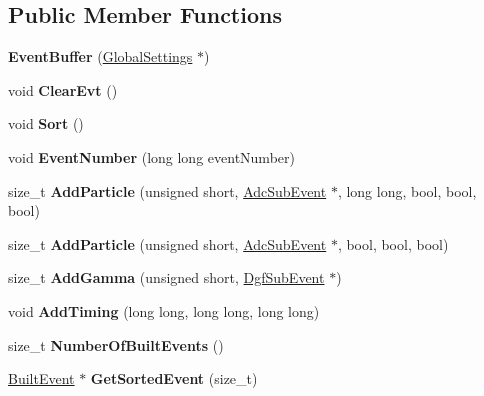 \subsection*{Public Member Functions}
\begin{DoxyCompactItemize}
\item 
\mbox{\label{class_event_buffer_a88ffe92cf134a8cd11d3f52ef7533005}} 
{\bfseries Event\+Buffer} (\hyperlink{class_global_settings}{Global\+Settings} $\ast$)
\item 
\mbox{\label{class_event_buffer_a3517c46566afc4abe5bf635cb84ac685}} 
void {\bfseries Clear\+Evt} ()
\item 
\mbox{\label{class_event_buffer_ada9809ccfcc0bb691736cf6f54e270e2}} 
void {\bfseries Sort} ()
\item 
\mbox{\label{class_event_buffer_af87a5d899fa6f8dd65216eab060febd6}} 
void {\bfseries Event\+Number} (long long event\+Number)
\item 
\mbox{\label{class_event_buffer_af109a5cce70d162db4dabd4c0b2c80eb}} 
size\+\_\+t {\bfseries Add\+Particle} (unsigned short, \hyperlink{class_adc_sub_event}{Adc\+Sub\+Event} $\ast$, long long, bool, bool, bool)
\item 
\mbox{\label{class_event_buffer_a8e6f4c031cd9901aec6d547a3ade0ed4}} 
size\+\_\+t {\bfseries Add\+Particle} (unsigned short, \hyperlink{class_adc_sub_event}{Adc\+Sub\+Event} $\ast$, bool, bool, bool)
\item 
\mbox{\label{class_event_buffer_a66c0da96e0073a20aa5e579ed2336eb7}} 
size\+\_\+t {\bfseries Add\+Gamma} (unsigned short, \hyperlink{class_dgf_sub_event}{Dgf\+Sub\+Event} $\ast$)
\item 
\mbox{\label{class_event_buffer_aacc0229711693e6df7aa944456c2178f}} 
void {\bfseries Add\+Timing} (long long, long long, long long)
\item 
\mbox{\label{class_event_buffer_a2a1210455f715b292c0424f770ab4703}} 
size\+\_\+t {\bfseries Number\+Of\+Built\+Events} ()
\item 
\mbox{\label{class_event_buffer_afc435d3702c062b229432300057b4c27}} 
\hyperlink{class_built_event}{Built\+Event} $\ast$ {\bfseries Get\+Sorted\+Event} (size\+\_\+t)
\end{DoxyCompactItemize}
